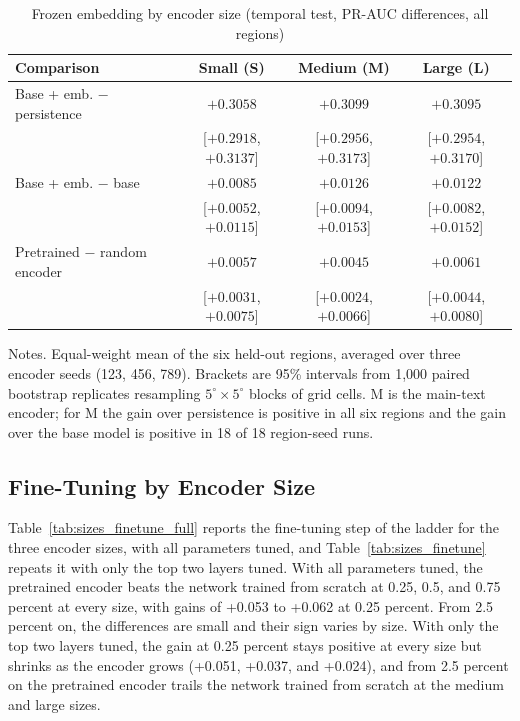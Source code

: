 \documentclass[11pt, letterpaper]{article}
\begin{document}
\begin{table}[!htbp]
\centering\footnotesize
\caption{Frozen embedding by encoder size (temporal test, PR-AUC differences, all regions)}
\label{tab:sizes_frozen}
\begin{tabular}{lccc}
\hline
Comparison & Small (S) & Medium (M) & Large (L) \\
\hline
Base + emb. $-$ persistence & $+0.3058$ & $+0.3099$ & $+0.3095$ \\
 & [$+0.2918$, $+0.3137$] & [$+0.2956$, $+0.3173$] & [$+0.2954$, $+0.3170$] \\
Base + emb. $-$ base & $+0.0085$ & $+0.0126$ & $+0.0122$ \\
 & [$+0.0052$, $+0.0115$] & [$+0.0094$, $+0.0153$] & [$+0.0082$, $+0.0152$] \\
Pretrained $-$ random encoder & $+0.0057$ & $+0.0045$ & $+0.0061$ \\
 & [$+0.0031$, $+0.0075$] & [$+0.0024$, $+0.0066$] & [$+0.0044$, $+0.0080$] \\
\hline
\end{tabular}
\begin{minipage}{0.98\textwidth}\footnotesize\vspace{0.5ex}
Notes. Equal-weight mean of the six held-out regions, averaged over three encoder seeds (123, 456, 789). Brackets are 95\% intervals from 1,000 paired bootstrap replicates resampling $5^\circ \times 5^\circ$ blocks of grid cells. M is the main-text encoder; for M the gain over persistence is positive in all six regions and the gain over the base model is positive in 18 of 18 region-seed runs.
\end{minipage}
\end{table}

\subsection{Fine-Tuning by Encoder Size}
\label{app:sizes_finetune}
Table~\ref{tab:sizes_finetune_full} reports the fine-tuning step of the ladder for the three encoder sizes, with all parameters tuned, and Table~\ref{tab:sizes_finetune} repeats it with only the top two layers tuned. With all parameters tuned, the pretrained encoder beats the network trained from scratch at 0.25, 0.5, and 0.75 percent at every size, with gains of +0.053 to +0.062 at 0.25 percent. From 2.5 percent on, the differences are small and their sign varies by size. With only the top two layers tuned, the gain at 0.25 percent stays positive at every size but shrinks as the encoder grows (+0.051, +0.037, and +0.024), and from 2.5 percent on the pretrained encoder trails the network trained from scratch at the medium and large sizes.
\end{document}
